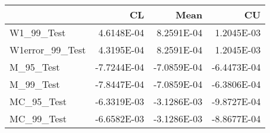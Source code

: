 \begin{tabular}{lrrr}
\toprule
{} &          CL &        Mean &          CU \\
\midrule
W1\_99\_Test      &  4.6148E-04 &  8.2591E-04 &  1.2045E-03 \\
W1error\_99\_Test &  4.3195E-04 &  8.2591E-04 &  1.2045E-03 \\
M\_95\_Test       & -7.7244E-04 & -7.0859E-04 & -6.4473E-04 \\
M\_99\_Test       & -7.8447E-04 & -7.0859E-04 & -6.3806E-04 \\
MC\_95\_Test      & -6.3319E-03 & -3.1286E-03 & -9.8727E-04 \\
MC\_99\_Test      & -6.6582E-03 & -3.1286E-03 & -8.8677E-04 \\
\bottomrule
\end{tabular}

